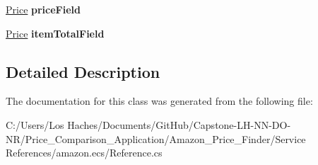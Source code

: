 \begin{DoxyCompactItemize}
\item 
\hypertarget{class_price___comparison_1_1amazon_1_1ecs_1_1_cart_item_ada9cf39694b49811a927836819f2d5b2}{\hyperlink{class_price___comparison_1_1amazon_1_1ecs_1_1_price}{Price} {\bfseries price\-Field}}\label{class_price___comparison_1_1amazon_1_1ecs_1_1_cart_item_ada9cf39694b49811a927836819f2d5b2}

\item 
\hypertarget{class_price___comparison_1_1amazon_1_1ecs_1_1_cart_item_acb2d7dace80282971305ef29b52c423b}{\hyperlink{class_price___comparison_1_1amazon_1_1ecs_1_1_price}{Price} {\bfseries item\-Total\-Field}}\label{class_price___comparison_1_1amazon_1_1ecs_1_1_cart_item_acb2d7dace80282971305ef29b52c423b}

\end{DoxyCompactItemize}


\subsection{Detailed Description}


The documentation for this class was generated from the following file\-:\begin{DoxyCompactItemize}
\item 
C\-:/\-Users/\-Los Haches/\-Documents/\-Git\-Hub/\-Capstone-\/\-L\-H-\/\-N\-N-\/\-D\-O-\/\-N\-R/\-Price\-\_\-\-Comparison\-\_\-\-Application/\-Amazon\-\_\-\-Price\-\_\-\-Finder/\-Service References/amazon.\-ecs/Reference.\-cs\end{DoxyCompactItemize}
